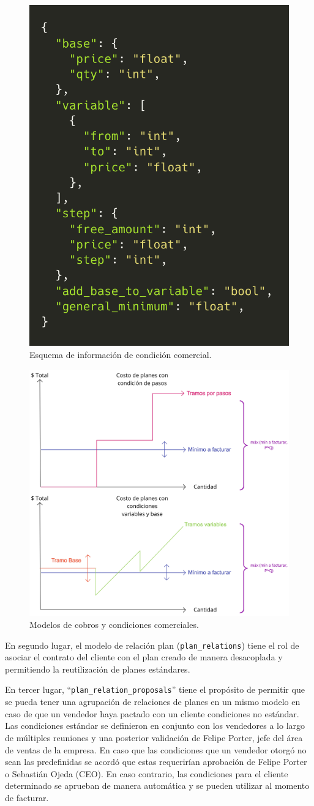     \begin{figure}
      \centering
      \includegraphics[width=0.4\linewidth]{figures/cc/cc_condition_schema.png}
      \caption{Esquema de información de condición comercial.}
      \label{fig:cc_condition_schema}
    \end{figure}

    \begin{figure}
      \centering
      \includegraphics[width=0.75\linewidth]{figures/cc/cc_pricing_chart.jpg}
      \caption{Modelos de cobros y condiciones comerciales.}
      \label{fig:cc_pricing_chart}
    \end{figure}

    En segundo lugar, el modelo de relación plan (\texttt{plan\_relations}) tiene el rol de asociar el contrato del cliente con el plan creado de manera desacoplada y permitiendo la reutilización de planes estándares. 
    
    En tercer lugar, ``\texttt{plan\_relation\_proposals}'' tiene el propósito de permitir que se pueda tener una agrupación de relaciones de planes en un mismo modelo en caso de que un vendedor haya pactado con un cliente condiciones no estándar. Las condiciones estándar se definieron en conjunto con los vendedores a lo largo de múltiples reuniones y una posterior validación de Felipe Porter, jefe del área de ventas de la empresa. En caso que las condiciones que un vendedor otorgó no sean las predefinidas se acordó que estas requerirían aprobación de Felipe Porter o Sebastián Ojeda (CEO). En caso contrario, las condiciones para el cliente determinado se aprueban de manera automática y se pueden utilizar al momento de facturar.
    
